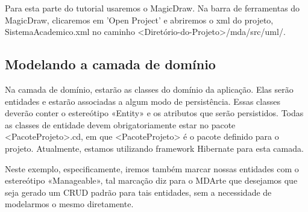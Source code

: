 Para esta parte do tutorial usaremos o MagicDraw. Na barra de ferramentas do
MagicDraw, clicaremos em 'Open Project' e abriremos o xml do projeto,
SistemaAcademico.xml no caminho
<Diretório-do-Projeto>/mda/src/uml/.

\subsection{Modelando a camada de domínio}
Na camada de domínio, estarão as classes do domínio da aplicação. Elas serão entidades e
estarão associadas a algum modo de persistência. Essas classes deverão conter o estereótipo
«Entity» e os atributos que serão persistidos. Todas as classes de entidade devem obrigatoriamente
estar no pacote <PacoteProjeto>.cd, em que <PacoteProjeto> é o pacote definido para o projeto.
Atualmente, estamos utilizando framework Hibernate para esta camada. 

Neste exemplo, especificamente, iremos também marcar nossas entidades com o
estereótipo «Manageable», tal marcação diz para o MDArte que desejamos que seja
gerado um CRUD padrão para tais entidades, sem a necessidade de modelarmos o
mesmo diretamente.


